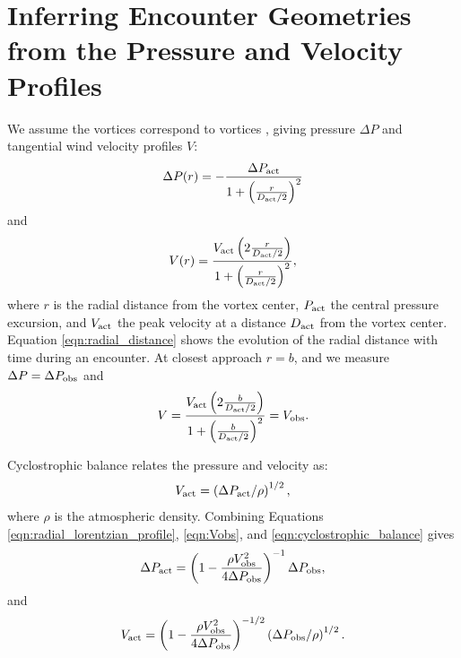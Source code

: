\documentclass[linenumbers,trackchanges]{aastex63}
\begin{document}
\section{Inferring Encounter Geometries from the Pressure and Velocity Profiles}
\label{sec:Inferring Encounter Geometries from the Pressure and Velocity Profiles}
We assume the vortices correspond to  vortices \citep{1991ExFl...11...73V}, giving pressure $\Delta P$ and tangential wind velocity profiles $V$:
\begin{equation}
    \Delta P(r) = -\frac{\Delta P_{\rm act}}{1 + \left( \frac{r}{D_{\rm act}/2} \right)^2}\label{eqn:radial_lorentzian_profile}
\end{equation}
and
\begin{equation}
    V(r) = \frac{ V_{\rm act} \left( 2 \frac{r}{D_{\rm act}/2} \right)}{1 + \left( \frac{r}{D_{\rm act}/2} \right)^2},\label{eqn:radial_wind_profile}
\end{equation}
where $r$ is the radial distance from the vortex center, $P_{\rm act}$ the central pressure excursion, and $V_{\rm act}$ the peak velocity at a distance $D_{\rm act}$ from the vortex center. Equation \ref{eqn:radial_distance} shows the evolution of the radial distance with time during an encounter. At closest approach $r = b$, and we measure $\Delta P = \Delta P_{\rm obs}$ and 
\begin{equation}
    V = \frac{ V_{\rm act} \left( 2\frac{b}{D_{\rm act}/2} \right)}{1 + \left( \frac{b}{D_{\rm act}/2} \right)^2} = V_{\rm obs}.\label{eqn:Vobs}
\end{equation} 

Cyclostrophic balance relates the pressure and velocity \citep{2020Icar..33813523J} as:
\begin{equation}
    V_{\rm act} = \left( \Delta P_{\rm act}/\rho \right)^{1/2},\label{eqn:cyclostrophic_balance}
\end{equation}
where $\rho$ is the atmospheric density. Combining Equations \ref{eqn:radial_lorentzian_profile}, \ref{eqn:Vobs}, and \ref{eqn:cyclostrophic_balance} gives
\begin{equation}
    \Delta P_{\rm act} = \left( 1 - \frac{\rho V_{\rm obs}^2}{4 \Delta P_{\rm obs}} \right)^{-1} \Delta P_{\rm obs},\label{eqn:solution_for_Pact}
\end{equation}
and
\begin{equation}
    V_{\rm act} = \left( 1 - \frac{\rho V_{\rm obs}^2}{4 \Delta P_{\rm obs}} \right)^{-1/2} \left( \Delta P_{\rm obs}/\rho \right)^{1/2}.\label{eqn:solution_for_Vact}
\end{equation}
\end{document}
